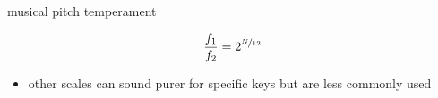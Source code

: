 \begin{frame}{musical pitch}{ temperament}
\begin{itemize}
            \end{itemize}
            \bigskip
            
            \begin{equation*}
                \frac{f_1}{f_2} = 2^{\nicefrac{N}{12}} 
            \end{equation*}
            
             \begin{itemize}
                \item	other scales can sound purer for specific keys but are less commonly used
            \end{itemize}
       \end{frame}
        
